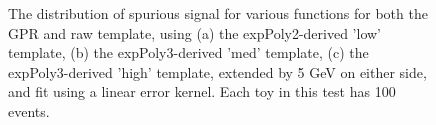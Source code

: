 \begin{figure} 
\begin{center}

\caption{The distribution of spurious signal for various functions for both the GPR and raw template, using (a) the expPoly2-derived 'low' template, (b) the expPoly3-derived 'med' template, (c) the expPoly3-derived 'high' template, extended by 5 GeV on either side, and fit using a linear error kernel. Each toy in this test has 100 events.}
\label{fig:linearkernel_lowpt_100_noSig}
\end{center}
\end{figure}

